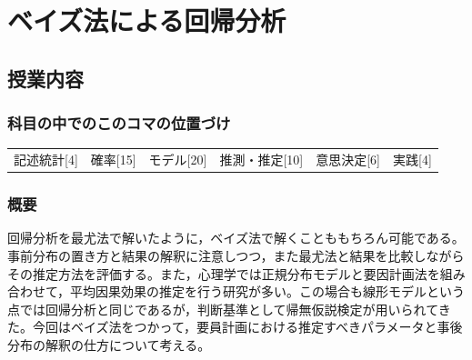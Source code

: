 \section{ベイズ法による回帰分析}
\label{D1_lesson28}

\subsection{授業内容}
\subsubsection{科目の中でのこのコマの位置づけ}
\begin{tabular}[t]{cccccc}
    記述統計[4] & 確率[15] & モデル[20] & 推測・推定[10] & 意思決定[6] & 実践[4]
\end{tabular}
\subsubsection{概要}
回帰分析を最尤法で解いたように，ベイズ法で解くことももちろん可能である。事前分布の置き方と結果の解釈に注意しつつ，また最尤法と結果を比較しながらその推定方法を評価する。また，心理学では正規分布モデルと要因計画法を組み合わせて，平均因果効果の推定を行う研究が多い。この場合も線形モデルという点では回帰分析と同じであるが，判断基準として帰無仮説検定が用いられてきた。今回はベイズ法をつかって，要員計画における推定すべきパラメータと事後分布の解釈の仕方について考える。

